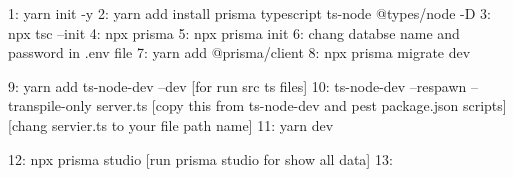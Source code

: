 1: yarn init -y
2: yarn add install prisma typescript ts-node @types/node -D
3: npx tsc --init
4: npx prisma
5: npx prisma init
6: chang databse name and password in .env file 
7: yarn add @prisma/client
8: npx prisma migrate dev


9: yarn add ts-node-dev --dev [for run src ts files]
10: ts-node-dev --respawn --transpile-only server.ts [copy this from ts-node-dev and pest package.json scripts] [chang servier.ts to your file path name]
11: yarn dev


12: npx prisma studio [run prisma studio for show all data]
13:



